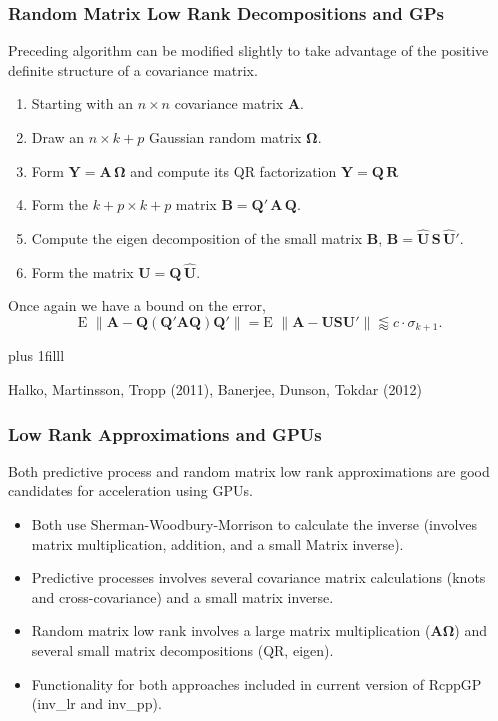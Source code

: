 \documentclass[t]{beamer}\usepackage[]{graphicx}\usepackage[]{color}
\newcommand{\vvfill}{\vskip0pt plus 1filll}
\begin{document}
\begin{frame}
\frametitle{Random Matrix Low Rank Decompositions and GPs}

Preceding algorithm can be modified slightly to take advantage of the positive definite structure of a covariance matrix.

\begin{enumerate}
\item Starting with an $n \times n$ covariance matrix $\bm{A}$.
\item Draw an $n \times k+p$ Gaussian random matrix $\bm{\Omega}$.
\item Form $\bm{Y} = \bm{A}\,\bm{\Omega}$ and compute its QR factorization $\bm{Y} = \bm{Q}\,\bm{R}$
\item Form the $k+p \times k+p$ matrix $\bm{B}=\bm{Q}'\,\bm{A} \, \bm{Q}$.
\item Compute the eigen decomposition of the small matrix $\bm{B}$, $\bm{B} = \bm{\hat{U}}\,\bm{S}\,\bm{\hat{U}}'$.
\item Form the matrix $\bm{U} = \bm{Q} \, \bm{\hat{U}}$.
\end{enumerate}

Once again we have a bound on the error,
%
\vspace{1mm}
\[
   \text{E } \| \bm{A} - \bm{Q}(\bm{Q}'\bm{A}\bm{Q})\bm{Q}'\| 
 = \text{E } \| \bm{A} - \bm{U}\bm{S}\bm{U}'\| 
\lessapprox c \cdot \sigma_{k+1}. 
\]

\vvfill

{\footnotesize
\begin{center}
Halko, Martinsson, Tropp (2011), Banerjee, Dunson, Tokdar (2012)
\end{center}
}

\end{frame}



\begin{frame}[fragile]
\frametitle{Low Rank Approximations and GPUs}

Both predictive process and random matrix low rank approximations are good candidates for acceleration using GPUs.

\begin{itemize}
\item Both use Sherman-Woodbury-Morrison to calculate the inverse (involves matrix multiplication, addition, and a small Matrix inverse).

\item Predictive processes involves several covariance matrix calculations (knots and cross-covariance) and a small matrix inverse.

\item Random matrix low rank involves a large matrix multiplication ($\bm{A}\bm{\Omega}$) and several small matrix decompositions (QR, eigen).

\item Functionality for both approaches included in current version of RcppGP (inv\_lr and
inv\_pp).

\end{itemize}

\end{frame}
\end{document}
